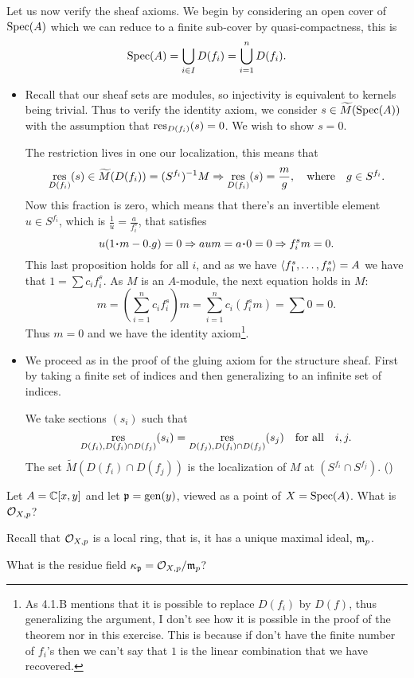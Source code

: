 \documentclass[12pt]{memoir}
\begin{document}
\begin{ptcbr}
Let us now verify the sheaf axioms. We begin by considering an open cover of $\operatorname{Spec}(A)$ which we can reduce to a finite sub-cover by quasi-compactness, this is 
$$\operatorname{Spec}(A)=\bigcup_{i\in I}D(f_i)=\bigcup_{i=1}^{n}D(f_i).$$
\begin{itemize}
    \item Recall that our sheaf sets are modules, so injectivity is equivalent to kernels being trivial. Thus to verify the identity axiom, we consider $s\in\widetilde{M}(\operatorname{Spec}(A))$ with the assumption that $\operatorname*{res}_{D(f_i)}(s)=0$. We wish to show $s=0$.\par 
    The restriction lives in one our localization, this means that 
    $$\operatorname*{res}_{D(f_i)}(s)\in\widetilde{M}(D(f_i))=(S^{f_i})^{-1}M\Rightarrow\operatorname*{res}_{D(f_i)}(s)=\frac{m}{g},\quad\text{where}\quad g\in S^{f_i}.$$
    Now this fraction is zero, which means that there's an invertible element $u\in S^{f_i}$, which is $\frac{1}{u}=\frac{a}{f_i^{s}}$, that satisfies
    $$u(1\.m-0.g)=0\To aum=a\.0=0\To f_i^{s}m=0.$$
    This last proposition holds for all $i$, and as we have $\left\langle f_1^s,\dots,f_n^s\right\rangle=A$ we have that $1=\sum c_if_i^s$. As $M$ is an $A$-module, the next equation holds in $M$:
    $$m=\left(\sum_{i=1}^{n}c_if_i^{s}\right)m=\sum_{i=1}^{n}c_i(f_i^{s}m)=\sum0=0.$$
    Thus $m=0$ and we have the identity axiom\footnote{As 4.1.B mentions that it is possible to replace $D(f_i)$ by $D(f)$, thus generalizing the argument, I don't see how it is possible in the proof of the theorem nor in this exercise. This is because if don't have the finite number of $f_i$'s then we can't say that $1$ is the linear combination that we have recovered.}.
    \item We proceed as in the proof of the gluing axiom for the structure sheaf. First by taking a finite set of indices and then generalizing to an infinite set of indices.\par 
    We take sections $(s_i)$ such that 
    $$\operatorname*{res}_{D(f_i),D(f_i)\cap D(f_j)}(s_i)=\operatorname*{res}_{D(f_j),D(f_i)\cap D(f_j)}(s_j)\quad\text{for all}\quad i,j.$$
    The set $\tilde{M}(D(f_i)\cap D(f_j))$ is the localization of $M$ at $(S^{f_i}\cap S^{f_j})$. ()
\end{itemize}
    \end{ptcbr}

    \begin{Ej}
        Let $A = \mathbb{C}[x,y]$ and let $\mathfrak{p}=\operatorname{gen}(y)$, viewed as a point of $X = \operatorname{Spec}(A)$. What is $\mathcal{O}_{X,p}$?\par
        Recall that $\mathcal{O}_{X,p}$ is a local ring, that is, it has a unique maximal ideal, $\mathfrak{m}_p$.\par 
        What is the residue field $\kappa_{\mathfrak{p}}=\mathcal{O}_{X,p}/\mathfrak{m}_p$?
    \end{Ej}
    
\end{document}
